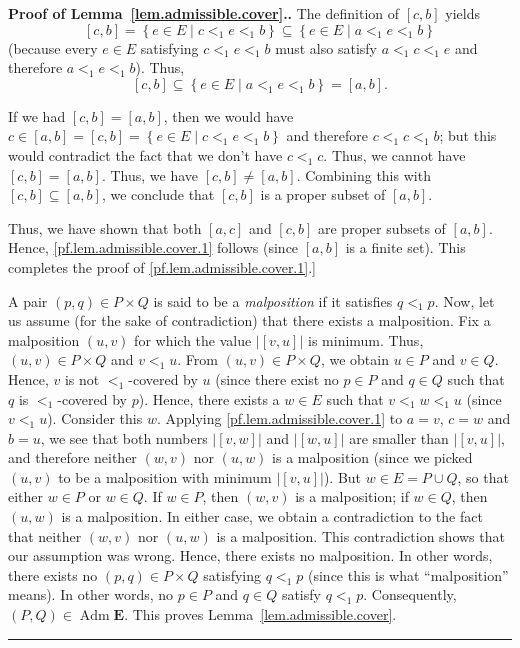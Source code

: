 \documentclass[numbers=enddot,12pt,final,onecolumn,notitlepage,abstracton]{scrartcl}
\theoremstyle{definition}
\newenvironment{proof}[1][Proof]{\noindent\textbf{#1.} }{\ \rule{0.5em}{0.5em}}
\newenvironment{verlong}{}{}
\newcommand{\Adm}{\operatorname{Adm}}
\newcommand{\EE}{{\mathbf{E}}}
\begin{document}
\begin{proof}[Proof of Lemma~\ref{lem.admissible.cover}.]
\begin{verlong}
The definition of $\left[c, b\right]$ yields
\[
\left[c, b\right]
= \left\{ e \in E \mid c <_1 e <_1 b \right\}
\subseteq \left\{ e \in E \mid a <_1 e <_1 b \right\}
\]
(because every $e \in E$ satisfying $c <_1 e <_1 b$
must also satisfy $a <_1 c <_1 e$ and therefore
$a <_1 e <_1 b$). Thus,
\[
\left[c, b\right]
\subseteq \left\{ e \in E \mid a <_1 e <_1 b \right\}
= \left[a, b\right] .
\]

If we had $\left[c, b\right] = \left[a, b\right]$,
then we would have $c \in \left[a, b\right]
= \left[c, b\right]
= \left\{ e \in E \mid c <_1 e <_1 b \right\}$
and therefore $c <_1 c <_1 b$; but this would contradict the
fact that we don't have $c <_1 c$. Thus, we cannot have
$\left[c, b\right] = \left[a, b\right]$. Thus, we have
$\left[c, b\right] \neq \left[a, b\right]$. Combining
this with $\left[c, b\right] \subseteq \left[a, b\right]$,
we conclude that $\left[c, b\right]$ is a proper
subset of $\left[a, b\right]$.

Thus, we have shown that both $\left[a, c\right]$ and
$\left[c, b\right]$ are proper subsets of $\left[a, b\right]$.
Hence, \eqref{pf.lem.admissible.cover.1} follows
(since $\left[a, b\right]$ is a finite set). This completes
the proof of \eqref{pf.lem.admissible.cover.1}.]
\end{verlong}

A pair $\left(p, q\right) \in P \times Q$ is said to be a
\textit{malposition} if it satisfies $q <_1 p$. Now, let us
assume (for the sake of contradiction) that there exists a
malposition. Fix a malposition $\left(u, v\right)$ for which the
value $\left|\left[v, u\right]\right|$ is minimum. Thus,
$\left(u, v\right) \in P \times Q$ and $v <_1 u$.
From $\left(u, v\right) \in P \times Q$, we obtain
$u \in P$ and $v \in Q$. Hence, $v$ is not
$<_1$-covered by $u$ (since there exist no $p \in P$ and $q \in Q$
such that $q$ is $<_1$-covered by $p$). Hence, there exists a
$w \in E$ such that $v <_1 w <_1 u$ (since $v <_1 u$). Consider
this $w$. Applying \eqref{pf.lem.admissible.cover.1} to $a = v$,
$c = w$ and $b = u$, we see that both numbers
$\left|\left[v, w\right]\right|$ and
$\left|\left[w, u\right]\right|$ are smaller than
$\left|\left[v, u\right]\right|$, and therefore neither
$\left(w, v\right)$ nor $\left(u, w\right)$ is a malposition
(since we picked $\left(u, v\right)$ to be a malposition with
minimum $\left|\left[v, u\right]\right|$). But
$w \in E = P \cup Q$, so that either $w \in P$ or $w \in Q$.
If $w \in P$, then $\left(w, v\right)$ is a malposition;
if $w \in Q$, then $\left(u, w\right)$ is a malposition. In
either case, we obtain a contradiction to the fact that
neither $\left(w, v\right)$ nor $\left(u, w\right)$ is a malposition.
This contradiction shows that our assumption was wrong.
Hence, there exists no malposition. In other words, there
exists no $\left(p, q\right) \in P \times Q$ satisfying
$q <_1 p$ (since this is what ``malposition'' means). In
other words, no $p \in P$ and $q \in Q$ satisfy $q <_1 p$.
Consequently, $\left(P, Q\right) \in \Adm \EE$.
This proves Lemma~\ref{lem.admissible.cover}.
\end{proof}
\end{document}
